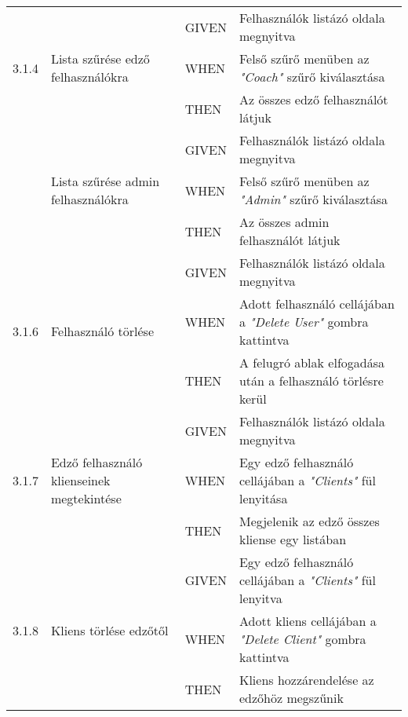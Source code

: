 \begin{center}
\begin{longtable}{ | p{} | p{} | p{} | p{} | }
			\multirow{3}{*}{3.1.4} 
			& \multirow{3}{=}{Lista szűrése edző felhasználókra} 
			& GIVEN 
			& Felhasználók listázó oldala megnyitva \\
			\cline{3-4}
			& & WHEN 
			& Felső szűrő menüben az \emph{"Coach"} szűrő kiválasztása \\
			\cline{3-4}
			& & THEN 
			& Az összes edző felhasználót látjuk \\
			\hline

			\pagebreak

			\multirow{3}{*}{3.1.5} 
			& \multirow{3}{=}{Lista szűrése admin felhasználókra} 
			& GIVEN 
			& Felhasználók listázó oldala megnyitva \\
			\cline{3-4}
			& & WHEN 
			& Felső szűrő menüben az \emph{"Admin"} szűrő kiválasztása \\
			\cline{3-4}
			& & THEN 
			& Az összes admin felhasználót látjuk \\
			\hline

			\multirow{3}{*}{3.1.6} 
			& \multirow{3}{=}{Felhasználó törlése} 
			& GIVEN 
			& Felhasználók listázó oldala megnyitva \\
			\cline{3-4}
			& & WHEN 
			& Adott felhasználó cellájában a \emph{"Delete User"} gombra kattintva \\
			\cline{3-4}
			& & THEN 
			& A felugró ablak elfogadása után a felhasználó törlésre kerül \\
			\hline

			\multirow{3}{*}{3.1.7} 
			& \multirow{3}{=}{Edző felhasználó klienseinek megtekintése} 
			& GIVEN 
			& Felhasználók listázó oldala megnyitva \\
			\cline{3-4}
			& & WHEN 
			& Egy edző felhasználó cellájában a \emph{"Clients"} fül lenyitása \\
			\cline{3-4}
			& & THEN 
			& Megjelenik az edző összes kliense egy listában \\
			\hline

			\multirow{3}{*}{3.1.8} 
			& \multirow{3}{=}{Kliens törlése edzőtől} 
			& GIVEN 
			& Egy edző felhasználó cellájában a \emph{"Clients"} fül lenyitva \\
			\cline{3-4}
			& & WHEN 
			& Adott kliens cellájában a \emph{"Delete Client"} gombra kattintva \\
			\cline{3-4}
			& & THEN 
			& Kliens hozzárendelése az edzőhöz megszűnik \\
			\hline







\end{longtable}
\end{center}
